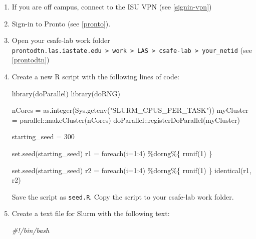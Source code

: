 \documentclass[
]{book}
\newenvironment{Shaded}{\begin{snugshade}}{\end{snugshade}}
\newcommand{\AttributeTok}[1]{\textcolor[rgb]{0.77,0.63,0.00}{#1}}
\newcommand{\CommentTok}[1]{\textcolor[rgb]{0.56,0.35,0.01}{\textit{#1}}}
\newcommand{\DecValTok}[1]{\textcolor[rgb]{0.00,0.00,0.81}{#1}}
\newcommand{\FunctionTok}[1]{\textcolor[rgb]{0.00,0.00,0.00}{#1}}
\newcommand{\NormalTok}[1]{#1}
\newcommand{\OtherTok}[1]{\textcolor[rgb]{0.56,0.35,0.01}{#1}}
\newcommand{\SpecialCharTok}[1]{\textcolor[rgb]{0.00,0.00,0.00}{#1}}
\newcommand{\StringTok}[1]{\textcolor[rgb]{0.31,0.60,0.02}{#1}}
\begin{document}
\begin{enumerate}
\def\labelenumi{\arabic{enumi}.}
\item
  If you are off campus, connect to the ISU VPN (see \ref{signin-vpn})
\item
  Sign-in to Pronto (see \ref{pronto}).
\item
  Open your csafe-lab work folder \texttt{prontodtn.las.iastate.edu\ \textgreater{}\ work\ \textgreater{}\ LAS\ \textgreater{}\ csafe-lab\ \textgreater{}\ your\_netid} (see \ref{prontodtn})
\item
  Create a new R script with the following lines of code:

\begin{Shaded}
\begin{Highlighting}[]
\FunctionTok{library}\NormalTok{(doParallel)}
\FunctionTok{library}\NormalTok{(doRNG)}

\NormalTok{nCores }\OtherTok{=} \FunctionTok{as.integer}\NormalTok{(}\FunctionTok{Sys.getenv}\NormalTok{(}\StringTok{"SLURM\_CPUS\_PER\_TASK"}\NormalTok{))}
\NormalTok{myCluster }\OtherTok{=}\NormalTok{ parallel}\SpecialCharTok{::}\FunctionTok{makeCluster}\NormalTok{(nCores)}
\NormalTok{doParallel}\SpecialCharTok{::}\FunctionTok{registerDoParallel}\NormalTok{(myCluster)}

\NormalTok{starting\_seed }\OtherTok{=} \DecValTok{300}

\FunctionTok{set.seed}\NormalTok{(starting\_seed)}
\NormalTok{r1 }\OtherTok{=} \FunctionTok{foreach}\NormalTok{(}\AttributeTok{i=}\DecValTok{1}\SpecialCharTok{:}\DecValTok{4}\NormalTok{) }\SpecialCharTok{\%dorng\%}\NormalTok{\{ }\FunctionTok{runif}\NormalTok{(}\DecValTok{1}\NormalTok{) \}}

\FunctionTok{set.seed}\NormalTok{(starting\_seed)}
\NormalTok{r2 }\OtherTok{=} \FunctionTok{foreach}\NormalTok{(}\AttributeTok{i=}\DecValTok{1}\SpecialCharTok{:}\DecValTok{4}\NormalTok{) }\SpecialCharTok{\%dorng\%}\NormalTok{\{ }\FunctionTok{runif}\NormalTok{(}\DecValTok{1}\NormalTok{) \}}
\FunctionTok{identical}\NormalTok{(r1, r2)}
\end{Highlighting}
\end{Shaded}

  Save the script as \texttt{seed.R}. Copy the script to your csafe-lab work folder.
\item
  Create a text file for Slurm with the following text:

\begin{Shaded}
\begin{Highlighting}[]
\CommentTok{\#!/bin/bash}


\end{Highlighting}
\end{Shaded}
\end{enumerate}
\end{document}
